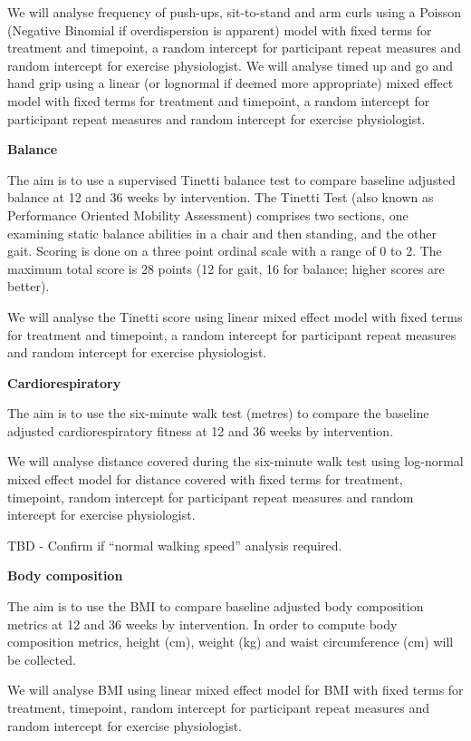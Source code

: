 \documentclass[
]{article}
\begin{document}
We will analyse frequency of push-ups, sit-to-stand and arm curls using a Poisson (Negative Binomial if overdispersion is apparent) model with fixed terms for treatment and timepoint, a random intercept for participant repeat measures and random intercept for exercise physiologist.
We will analyse timed up and go and hand grip using a linear (or lognormal if deemed more appropriate) mixed effect model with fixed terms for treatment and timepoint, a random intercept for participant repeat measures and random intercept for exercise physiologist.

\textbf{Balance}

The aim is to use a supervised Tinetti balance test to compare baseline adjusted balance at 12 and 36 weeks by intervention.
The Tinetti Test (also known as Performance Oriented Mobility Assessment) comprises two sections, one examining static balance abilities in a chair and then standing, and the other gait.
Scoring is done on a three point ordinal scale with a range of 0 to 2.
The maximum total score is 28 points (12 for gait, 16 for balance; higher scores are better).

We will analyse the Tinetti score using linear mixed effect model with fixed terms for treatment and timepoint, a random intercept for participant repeat measures and random intercept for exercise physiologist.

\textbf{Cardiorespiratory}

The aim is to use the six-minute walk test (metres) to compare the baseline adjusted cardiorespiratory fitness at 12 and 36 weeks by intervention.

We will analyse distance covered during the six-minute walk test using log-normal mixed effect model for distance covered with fixed terms for treatment, timepoint, random intercept for participant repeat measures and random intercept for exercise physiologist.

TBD - Confirm if ``normal walking speed'' analysis required.

\textbf{Body composition}

The aim is to use the BMI to compare baseline adjusted body composition metrics at 12 and 36 weeks by intervention.
In order to compute body composition metrics, height (cm), weight (kg) and waist circumference (cm) will be collected.

We will analyse BMI using linear mixed effect model for BMI with fixed terms for treatment, timepoint, random intercept for participant repeat measures and random intercept for exercise physiologist.
\end{document}
